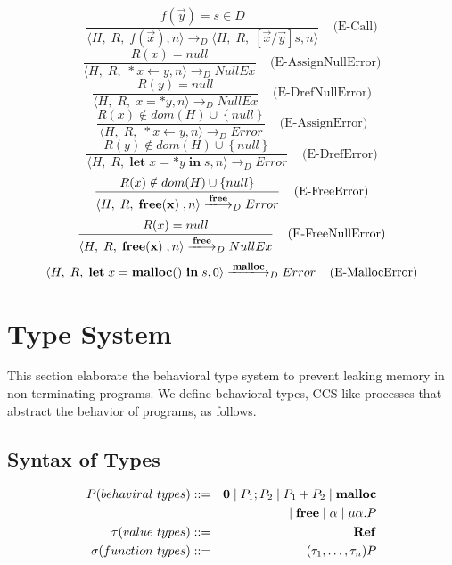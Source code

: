 \documentclass[english]{jssst_ppl} %
\newcommand\tB{\;|\;}
\newcommand\LET{\mathbf{let}\;}
\newcommand\FREE{\mathbf{free(x)}\;}
\newcommand\IN{\mathbf{in}\;}
\newcommand\Rtab{\; \; \; \;}
\newcommand\Lfc{\left\{}
\newcommand\Rfc{\right\}}
\newcommand\Lb{\left[}
\newcommand\Rb{\right]}
\newcommand\coma{,\;}
\newcommand\Malloc{\mathbf{malloc}}
\newcommand\Free{\mathbf{free}}
\begin{document}
$$
     \frac{f(\vec{y}) = s \in D}
            { \langle H\coma R\coma  f(\vec{x}) , n \rangle
               \longrightarrow_{D}
               \langle H\coma R\coma  \Lb \vec{x}/\vec{y} \Rb s , n \rangle}
      \Rtab \mbox{(E-Call)}
$$
$$
      \frac{R(x) = null}
            {\langle H\coma R\coma  *x \leftarrow y , n \rangle
              \longrightarrow_{D}
              NullEx }
      \Rtab \mbox{(E-AssignNullError)}
$$
$$
      \frac{R(y) = null}
             {\langle H\coma R\coma  x = *y, n \rangle
               \longrightarrow_{D}
               NullEx }
             \Rtab \mbox{(E-DrefNullError)}
$$
$$
     \frac{R(x) \notin dom(H) \cup \Lfc null \Rfc}
           {\langle H\coma R\coma   *x \leftarrow y,  n \rangle
             \longrightarrow_{D}
             Error }
    \Rtab \mbox{(E-AssignError)}
$$
$$
      \frac{R(y) \notin dom(H) \cup \Lfc null \Rfc}
           {\langle H\coma R\coma  \LET x  = *y \; \IN s, n \rangle
              \longrightarrow_{D}
                  Error }
      \Rtab \mbox{(E-DrefError)}
$$
%
$$
      \frac{R(x) \notin dom(H) \cup \Lfc null \Rfc}
            {\langle H\coma R\coma  \FREE , n \rangle
              \xlongrightarrow{\Free}_{D}
              Error }
     \Rtab \mbox{(E-FreeError)}
$$
%
$$
     \frac{R(x) =  null }
           {\langle H\coma R\coma  \FREE , n \rangle
             \xlongrightarrow{\Free}_{D} NullEx  }
      \Rtab \mbox{(E-FreeNullError)}
$$
$$
      \langle H\coma R\coma \LET x = \Malloc() \ \IN s ,  0  \rangle
      \xlongrightarrow{\Malloc}_{D}
      Error
      \Rtab \mbox{(E-MallocError)}
$$

\section{Type System}
This section elaborate the behavioral type system to prevent leaking memory in non-terminating programs. We define behavioral types, CCS-like processes that abstract the behavior of programs, as follows.
\subsection{Syntax of Types}
     \begin{eqnarray*}
       P (behaviral \ types)::=&& {\bf 0} \tB P_{1};P_{2} \tB P_{1}+P_{2} \tB \Malloc\\
       &&\tB \Free \tB \alpha \tB \mu\alpha.P \\
       \tau (value \ types)::=&&    \mathbf{Ref}  \\ %
       \sigma (function \ types)::=&& (\tau_{1},\dots, \tau_{n}) P
     \end{eqnarray*}
\end{document}
